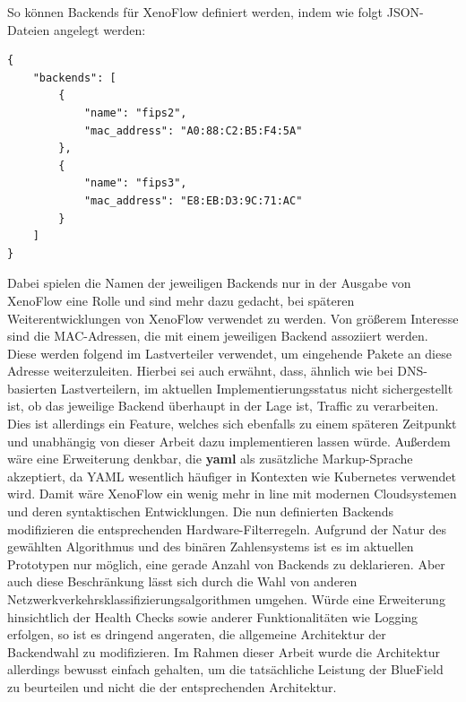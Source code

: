 So können Backends für XenoFlow definiert werden, indem wie folgt JSON-Dateien angelegt werden:
\begin{verbatim}
{
    "backends": [
        {
            "name": "fips2",
            "mac_address": "A0:88:C2:B5:F4:5A"
        },
        {
            "name": "fips3",
            "mac_address": "E8:EB:D3:9C:71:AC"
        }
    ] 
}
\end{verbatim}
Dabei spielen die Namen der jeweiligen Backends nur in der Ausgabe von XenoFlow eine Rolle und sind mehr dazu gedacht, bei späteren Weiterentwicklungen von XenoFlow verwendet zu werden. Von größerem Interesse sind die MAC-Adressen, die mit einem jeweiligen Backend assoziiert werden. Diese werden folgend im Lastverteiler verwendet, um eingehende Pakete an diese Adresse weiterzuleiten. Hierbei sei auch erwähnt, dass, ähnlich wie bei DNS-basierten Lastverteilern, im aktuellen Implementierungsstatus nicht sichergestellt ist, ob das jeweilige Backend überhaupt in der Lage ist, Traffic zu verarbeiten. Dies ist allerdings ein Feature, welches sich ebenfalls zu einem späteren Zeitpunkt und unabhängig von dieser Arbeit dazu implementieren lassen würde. Außerdem wäre eine Erweiterung denkbar, die \textbf{yaml} als zusätzliche Markup-Sprache akzeptiert, da YAML wesentlich häufiger in Kontexten wie Kubernetes verwendet wird. Damit wäre XenoFlow ein wenig mehr in line mit modernen Cloudsystemen und deren syntaktischen Entwicklungen.
\newline
Die nun definierten Backends modifizieren die entsprechenden Hardware-Filterregeln. Aufgrund der Natur des gewählten Algorithmus und des binären Zahlensystems ist es im aktuellen Prototypen nur möglich, eine gerade Anzahl von Backends zu deklarieren. Aber auch diese Beschränkung lässt sich durch die Wahl von anderen Netzwerkverkehrsklassifizierungsalgorithmen umgehen. Würde eine Erweiterung hinsichtlich der Health Checks sowie anderer Funktionalitäten wie Logging erfolgen, so ist es dringend angeraten, die allgemeine Architektur der Backendwahl zu modifizieren. Im Rahmen dieser Arbeit wurde die Architektur allerdings bewusst einfach gehalten, um die tatsächliche Leistung der BlueField zu beurteilen und nicht die der entsprechenden Architektur.
